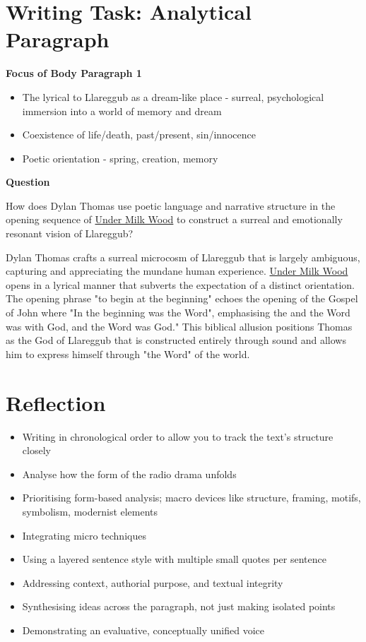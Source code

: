 		


\newpage

\section{Writing Task: Analytical Paragraph}

	\textbf{Focus of Body Paragraph 1}		

		\begin{itemize}
			\item The lyrical to Llareggub as a dream-like place - surreal, psychological immersion into a world of memory and dream
			\item Coexistence of life/death, past/present, sin/innocence
			\item Poetic orientation - spring, creation, memory
		\end{itemize}

	\textbf{Question}

		How does Dylan Thomas use poetic language and narrative structure in the opening sequence of \underline{Under Milk Wood} to construct a surreal and emotionally resonant vision of Llareggub?

		Dylan Thomas crafts a surreal microcosm of Llareggub that is largely ambiguous, capturing and appreciating the mundane human experience. \underline{Under Milk Wood} opens in a lyrical manner that subverts the expectation of a distinct orientation. The opening phrase "to begin at the beginning" echoes the opening of the Gospel of John where "In the beginning was the Word", emphasising the and the Word was with God, and the Word was God." This biblical allusion positions Thomas as the God of Llareggub that is constructed entirely through sound and allows him to express himself through "the Word" of the world.
\section{Reflection}

	\begin{itemize}
		\item Writing in chronological order to allow you to track the text's structure closely
		\item Analyse how the form of the radio drama unfolds
		\item Prioritising form-based analysis; macro devices like structure, framing, motifs, symbolism, modernist elements
		\item Integrating micro techniques
		\item Using a layered sentence style with multiple small quotes per sentence
		\item Addressing context, authorial purpose, and textual integrity
		\item Synthesising ideas across the paragraph, not just making isolated points 
		\item Demonstrating an evaluative, conceptually unified voice
	\end{itemize}

